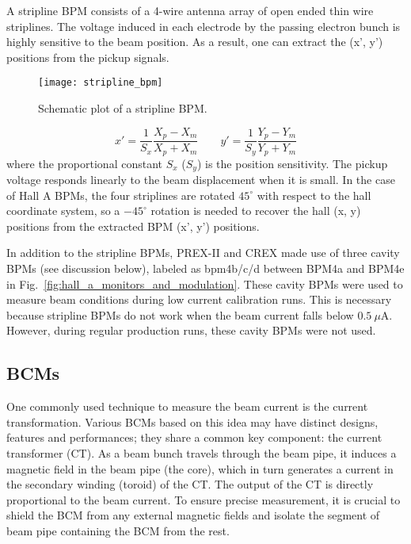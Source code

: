 A stripline BPM consists of a 4-wire antenna array of open ended thin wire striplines.
The voltage induced in each electrode by the passing electron bunch is highly 
sensitive to the beam position. As a result, one can extract the (x', y') positions 
from the pickup signals.
\begin{figure}[!h]
    \centering
    \texttt{[image: stripline\_bpm]}
    \caption{Schematic plot of a stripline BPM.}
\end{figure}
\begin{equation}
    x' = \frac{1}{S_x} \frac{X_p - X_m}{X_p + X_m}   \qquad
    y' = \frac{1}{S_y} \frac{Y_p - Y_m}{Y_p + Y_m}   
\end{equation}
where the proportional constant $S_x$ ($S_y$) is the position sensitivity. 
The pickup voltage responds linearly to the beam displacement when it
is small. In the case of Hall A BPMs, the four striplines are rotated $45^\circ$
with respect to the hall coordinate system, so a $-45^\circ$ rotation is needed to recover
the hall (x, y) positions from the extracted BPM (x', y') positions.

In addition to the stripline BPMs, PREX-II and CREX made use of three cavity BPMs (see discussion below),
labeled as bpm4b/c/d between BPM4a and BPM4e in Fig.~\ref{fig:hall_a_monitors_and_modulation}.
These cavity BPMs were used to measure beam conditions during low current calibration runs.
This is necessary because stripline BPMs do not work when the beam current falls below $0.5\ \mu$A. 
However, during regular production runs, these cavity BPMs were not used.

\subsection{BCMs}
One commonly used technique to measure the beam current is the current transformation.
Various BCMs based on this idea may have distinct designs, features and performances;
they share a common key component: the current transformer (CT). As a beam bunch 
travels through the beam pipe, it induces a magnetic field in the beam pipe (the core), 
which in turn generates a current in the secondary winding (toroid) of the CT.
The output of the CT is directly proportional to the beam current. 
To ensure precise measurement, it is crucial to shield the BCM from any external
magnetic fields and isolate the segment of beam pipe containing the BCM from the rest.

